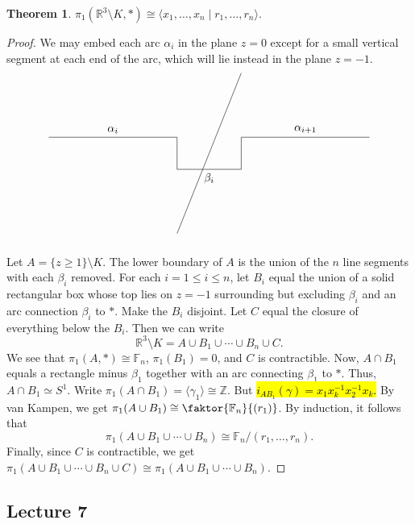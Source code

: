 \documentclass[10pt,letterpaper,cm]{nupset}
\theoremstyle{definition}
\theoremstyle{theorem}
\newtheorem{theorem}[definition]{Theorem}
\theoremstyle{remark}
\newcommand{\R}{\mathbb{R}}
\newcommand{\Z}{\mathbb Z}
\newcommand{\1}{\mathbb{1}}
\newcommand{\0}{\vec 0}
\begin{document}
\begin{theorem}
$\pi_1(\R^3 \setminus K, \ast) \cong \langle x_1, \ldots, x_n \mid r_1, \ldots, r_n \rangle$.
\end{theorem}
\begin{proof}
We may embed each arc $\alpha_i$ in the plane $z=0$ except for a small vertical segment at each end of the arc, which will lie instead in the plane $z=-1$. 
\[
\begin{tikzpicture}
  \draw (0,1) node (nodeA) [below]  {} -- (4,1) node (nodeB) [above] {} node [midway, above, sloped] (EdgeAB) {$\alpha_i$} -- (4,0) node [below] (nodeC) {} node [midway, above, sloped] (EdgeBC) {} -- (6,0) node [above] (nodeD) {} node [midway, below, sloped] (EdgeCD) {$\beta_i$} -- (6,1) node (nodeE) [below]  {} -- (10,1) node (nodeF) [below]  {} node [midway, above, sloped] (EdgeEF) {$\alpha_{i+1}$} 
(4,-2) node (nodeG) [below]  {} --  (6,3) node (nodeH) [below]  {};
\end{tikzpicture}
\]
Let $A = \{z\geq 1 \}\setminus K$. 
The lower boundary of $A$ is  the union of the $n$ line segments with each $\beta_i$ removed. For each $i=1\leq i \leq n$, let $B_i$ equal the union of a solid rectangular box whose top lies on $z=-1$ surrounding but excluding $\beta_i$ and an arc connection $\beta_i$ to $\ast$. Make the $B_i$ disjoint. Let $C$ equal the closure of everything below the $B_i$. 
Then  we can write $$\R^3 \setminus K = A \cup B_1 \cup \cdots \cup B_n \cup C.$$ We see that $\pi_1(A, \ast) \cong \mathbb{F}_n$, $\pi_1(B_1) =0$, and $C$ is contractible. Now, $A \cap B_1$ equals a rectangle minus $\beta_1$ together with an arc connecting $\beta_1$ to $\ast$. Thus, $A \cap B_1 \simeq S^1$. Write $\pi_1(A \cap B_1) = \langle \gamma_1 \rangle \cong \Z$. But \hl{$i_{AB_1}(\gamma) = x_1x_k^{-1}x_2^{-1}x_k$.} By van Kampen, we get $\pi_1(A \cup B_1) \cong \faktor{\mathbb{F}_n}{(r_1)}$. By induction, it follows that $$\pi_1(A \cup B_1 \cup \cdots \cup  B_n) \cong \mathbb{F}_n/(r_1, \ldots, r_n).$$ Finally, since $C$ is contractible, we get $\pi_1(A \cup B_1 \cup \cdots \cup  B_n \cup C) \cong \pi_1(A \cup B_1 \cup \cdots \cup  B_n).$
\end{proof}

\subsection{Lecture 7}
\end{document}
